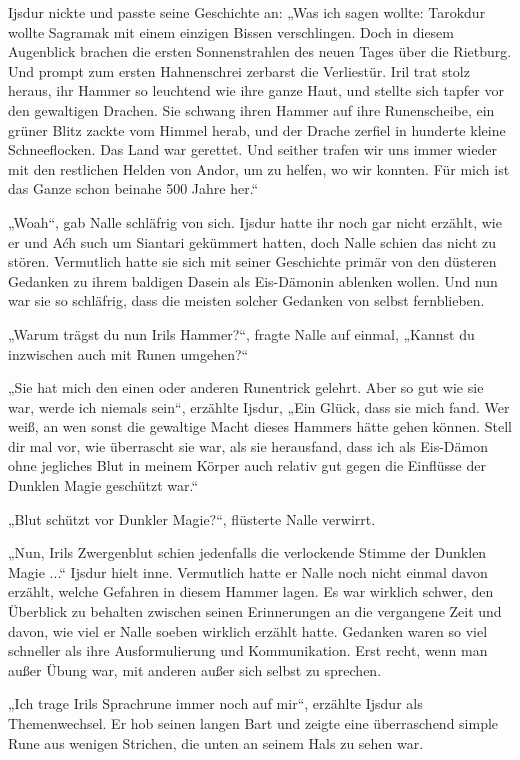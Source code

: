 Ijsdur nickte und passte seine Geschichte an: „Was ich sagen wollte: Tarokdur wollte Sagramak mit einem einzigen Bissen verschlingen. Doch in diesem Augenblick brachen die ersten Sonnenstrahlen des neuen Tages über die Rietburg. Und prompt zum ersten Hahnenschrei zerbarst die Verliestür. Iril trat stolz heraus, ihr Hammer so leuchtend wie ihre ganze Haut, und stellte sich tapfer vor den gewaltigen Drachen. Sie schwang ihren Hammer auf ihre Runenscheibe, ein grüner Blitz zackte vom Himmel herab, und der Drache zerfiel in hunderte kleine Schneeflocken. Das Land war gerettet. Und seither trafen wir uns immer wieder mit den restlichen Helden von Andor, um zu helfen, wo wir konnten. Für mich ist das Ganze schon beinahe 500 Jahre her.“

„Woah“, gab Nalle schläfrig von sich. Ijsdur hatte ihr noch gar nicht erzählt, wie er und Aćh such um Siantari gekümmert hatten, doch Nalle schien das nicht zu stören. Vermutlich hatte sie sich mit seiner Geschichte primär von den düsteren Gedanken zu ihrem baldigen Dasein als Eis-Dämonin ablenken wollen. Und nun war sie so schläfrig, dass die meisten solcher Gedanken von selbst fernblieben.

„Warum trägst du nun Irils Hammer?“, fragte Nalle auf einmal, „Kannst du inzwischen auch mit Runen umgehen?“

„Sie hat mich den einen oder anderen Runentrick gelehrt. Aber so gut wie sie war, werde ich niemals sein“, erzählte Ijsdur, „Ein Glück, dass sie mich fand. Wer weiß, an wen sonst die gewaltige Macht dieses Hammers hätte gehen können. Stell dir mal vor, wie überrascht sie war, als sie herausfand, dass ich als Eis-Dämon ohne jegliches Blut in meinem Körper auch relativ gut gegen die Einflüsse der Dunklen Magie geschützt war.“

„Blut schützt vor Dunkler Magie?“, flüsterte Nalle verwirrt.

„Nun, Irils Zwergenblut schien jedenfalls die verlockende Stimme der Dunklen Magie ...“ Ijsdur hielt inne. Vermutlich hatte er Nalle noch nicht einmal davon erzählt, welche Gefahren in diesem Hammer lagen. Es war wirklich schwer, den Überblick zu behalten zwischen seinen Erinnerungen an die vergangene Zeit und davon, wie viel er Nalle soeben wirklich erzählt hatte. Gedanken waren so viel schneller als ihre Ausformulierung und Kommunikation. Erst recht, wenn man außer Übung war, mit anderen außer sich selbst zu sprechen.

„Ich trage Irils Sprachrune immer noch auf mir“, erzählte Ijsdur als Themenwechsel. Er hob seinen langen Bart und zeigte eine überraschend simple Rune aus wenigen Strichen, die unten an seinem Hals zu sehen war.

